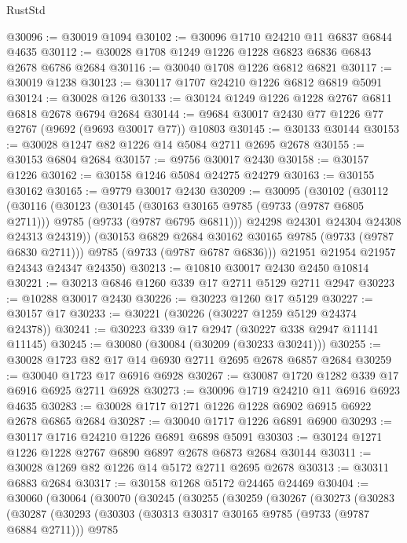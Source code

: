 \begin{lexlean}{RustStd}
\begin{coremodule}
@30096 := @30019 @1094
@30102 := @30096 @1710 @24210 @11 @6837 @6844 @4635
@30112 := @30028 @1708 @1249 @1226 @1228 @6823 @6836 @6843 @2678 @6786 @2684
@30116 := @30040 @1708 @1226 @6812 @6821
@30117 := @30019 @1238
@30123 := @30117 @1707 @24210 @1226 @6812 @6819 @5091
@30124 := @30028 @126
@30133 := @30124 @1249 @1226 @1228 @2767 @6811 @6818 @2678 @6794 @2684
@30144 := @9684 @30017 @2430 @77 @1226 @77 @2767 (@9692 (@9693 @30017 @77)) @10803
@30145 := @30133 @30144
@30153 := @30028 @1247 @82 @1226 @14 @5084 @2711 @2695 @2678
@30155 := @30153 @6804 @2684
@30157 := @9756 @30017 @2430
@30158 := @30157 @1226
@30162 := @30158 @1246 @5084 @24275 @24279
@30163 := @30155 @30162
@30165 := @9779 @30017 @2430
@30209 := @30095
    (@30102
      (@30112
        (@30116
          (@30123
            (@30145
              (@30163 @30165 @9785 (@9733 (@9787 @6805 @2711)))
              @9785
              (@9733 (@9787 @6795 @6811)))
            @24298
            @24301
            @24304
            @24308
            @24313
            @24319))
        (@30153 @6829 @2684 @30162 @30165 @9785 (@9733 (@9787 @6830 @2711)))
        @9785
        (@9733 (@9787 @6787 @6836)))
      @21951
      @21954
      @21957
      @24343
      @24347
      @24350)
@30213 := @10810 @30017 @2430 @2450 @10814
@30221 := @30213 @6846 @1260 @339 @17 @2711 @5129 @2711 @2947
@30223 := @10288 @30017 @2430
@30226 := @30223 @1260 @17 @5129
@30227 := @30157 @17
@30233 := @30221 (@30226 (@30227 @1259 @5129 @24374 @24378))
@30241 := @30223 @339 @17 @2947 (@30227 @338 @2947 @11141 @11145)
@30245 := @30080 (@30084 (@30209 (@30233 @30241)))
@30255 := @30028 @1723 @82 @17 @14 @6930 @2711 @2695 @2678 @6857 @2684
@30259 := @30040 @1723 @17 @6916 @6928
@30267 := @30087 @1720 @1282 @339 @17 @6916 @6925 @2711 @6928
@30273 := @30096 @1719 @24210 @11 @6916 @6923 @4635
@30283 := @30028 @1717 @1271 @1226 @1228 @6902 @6915 @6922 @2678 @6865 @2684
@30287 := @30040 @1717 @1226 @6891 @6900
@30293 := @30117 @1716 @24210 @1226 @6891 @6898 @5091
@30303 := @30124 @1271 @1226 @1228 @2767 @6890 @6897 @2678 @6873 @2684 @30144
@30311 := @30028 @1269 @82 @1226 @14 @5172 @2711 @2695 @2678
@30313 := @30311 @6883 @2684
@30317 := @30158 @1268 @5172 @24465 @24469
@30404 := @30060
    (@30064
      (@30070
        (@30245
          (@30255
            (@30259
              (@30267
                (@30273
                  (@30283
                    (@30287
                      (@30293
                        (@30303
                          (@30313 @30317 @30165 @9785 (@9733 (@9787 @6884 @2711)))
                          @9785

\end{coremodule}
\end{lexlean}
